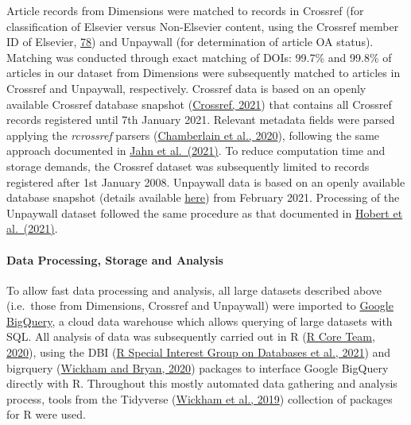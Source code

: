 \documentclass[
]{article}
\begin{document}
Article records from Dimensions were matched to records in Crossref (for classification of Elsevier versus Non-Elsevier content, using the Crossref member ID of Elsevier, \href{https://www.crossref.org/members/prep/78}{78}) and Unpaywall (for determination of article OA status). Matching was conducted through exact matching of DOIs:  99.7\% and 99.8\% of articles in our dataset from Dimensions were subsequently matched to articles in Crossref and Unpaywall, respectively. Crossref data is based on an openly available Crossref database snapshot (\href{https://academictorrents.com/details/e4287cb7619999709f6e9db5c359dda17e93d515}{Crossref, 2021}) that contains all Crossref records registered until 7th January 2021. Relevant metadata fields were parsed applying the \emph{rcrossref} parsers (\href{https://CRAN.R-project.org/package=rcrossref}{Chamberlain et al., 2020}), following the same approach documented in \href{https://arxiv.org/abs/2102.04789}{Jahn et al.~(2021)}. To reduce computation time and storage demands, the Crossref dataset was subsequently limited to records registered after 1st January 2008. Unpaywall data is based on an openly available database snapshot (details available \href{https://unpaywall.org/products/snapshot}{here}) from February 2021. Processing of the Unpaywall dataset followed the same procedure as that documented in \href{https://edoc.hu-berlin.de/handle/18452/23336}{Hobert et al.~(2021)}.

\hypertarget{data-processing-storage-and-analysis}{%
\paragraph{Data Processing, Storage and Analysis}\label{data-processing-storage-and-analysis}}

To allow fast data processing and analysis, all large datasets described above (i.e.~those from Dimensions, Crossref and Unpaywall) were imported to \href{https://cloud.google.com/bigquery}{Google BigQuery}, a cloud data warehouse which allows querying of large datasets with SQL. All analysis of data was subsequently carried out in R (\href{http://www.R-project.org/}{R Core Team, 2020}), using the DBI (\href{https://CRAN.R-project.org/package=DBI}{R Special Interest Group on Databases et al., 2021}) and bigrquery (\href{https://CRAN.R-project.org/package=bigrquery}{Wickham and Bryan, 2020}) packages to interface Google BigQuery directly with R. Throughout this mostly automated data gathering and analysis process, tools from the Tidyverse (\href{https://doi.org/10.21105/joss.01686}{Wickham et al., 2019}) collection of packages for R were used.
\end{document}
